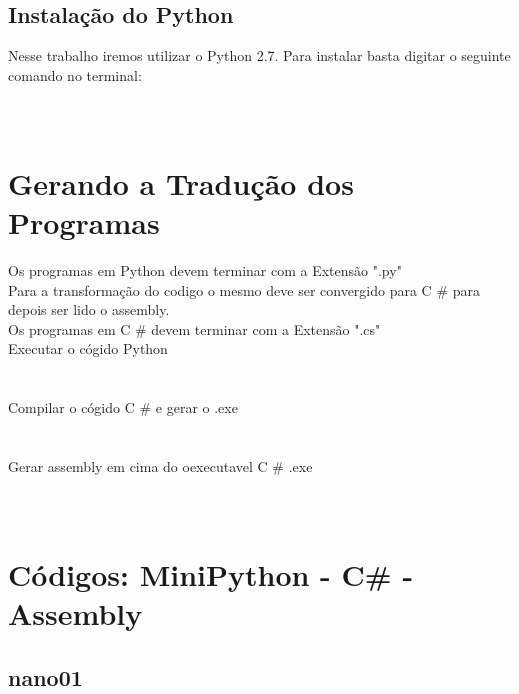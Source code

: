 \documentclass{article}
\begin{document}
\\\\


\subsection{Instalação do Python}
Nesse trabalho iremos utilizar o Python 2.7. Para instalar basta digitar o seguinte comando no terminal:\\

\\\\


\section{Gerando a Tradução dos Programas}
Os programas em Python devem terminar com a Extensão ".py"\\

Para a transformação do codigo o mesmo deve ser convergido para C \# para depois ser lido o assembly. \\
Os programas em C \# devem terminar com a Extensão ".cs"\\

Executar o cógido Python \\

\\\\

Compilar o cógido C \# e gerar o .exe\\

\\\\


Gerar assembly em cima do oexecutavel C \# .exe \\

\\\\


\section{Códigos:  MiniPython - C\# - Assembly}

\subsection{nano01}
\end{document}

